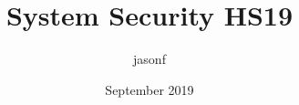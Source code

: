 \documentclass[a4paper, 8pt]{extarticle}
\title{System Security HS19}
\author{jasonf }
\date{September 2019}
\begin{document}
\maketitle
\begin{multicols*}{2}
\tableofcontents








\end{multicols*}
\end{document}
